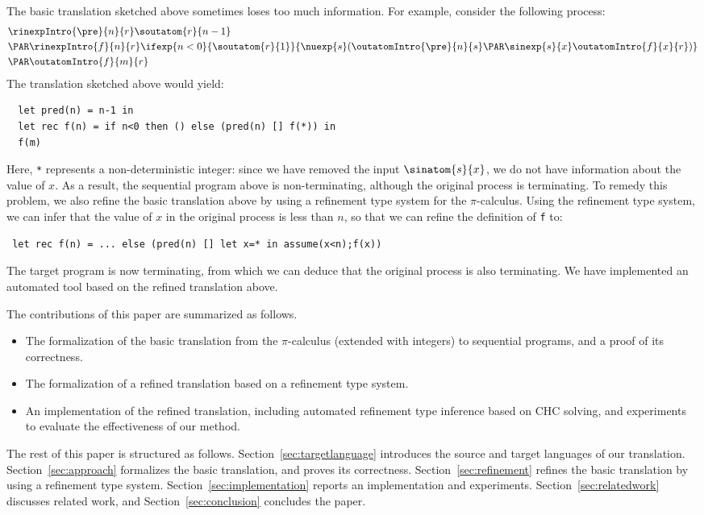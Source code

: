 The basic translation sketched above sometimes loses too much information.
For example, consider the following process:
\begin{align*}
    & \rinexpIntro{\pre}{n}{r} \soutatom{r}{n-1} \\
    & \PAR \rinexpIntro{f}{n}{r} \ifexp{n<0}{ \soutatom{r}{1} }
                                       { \nuexp{s} (\outatomIntro{\pre}{n}{s} \PAR \sinexp{s}{x}\outatomIntro{f}{x}{r}) } \\
    & \PAR \outatomIntro{f}{m}{r}
\end{align*}
The translation sketched above would yield:
\begin{verbatim}
  let pred(n) = n-1 in
  let rec f(n) = if n<0 then () else (pred(n) [] f(*)) in
  f(m)
\end{verbatim}
Here, \texttt{*} represents a non-deterministic integer: since we have removed
the input $\sinatom{s}{x}$, we do not have information about the value of \( x \).
As a result, the sequential program above is non-terminating, although the original
process is terminating.
To remedy this problem, we also refine the basic translation above by using a refinement
type system for the \(\pi\)-calculus. Using the refinement type system,
we can infer that the value of \(x\) in the original process is less than \(n\),
so that we can refine the definition of \texttt{f} to:
\begin{verbatim}
 let rec f(n) = ... else (pred(n) [] let x=* in assume(x<n);f(x))
\end{verbatim}
The target program is now terminating, from which
we can deduce that the original process is also terminating.
We have implemented an automated tool based on the refined translation above.

The contributions of this paper are summarized as follows.
\begin{itemize}
\item The formalization of the basic translation from the \(\pi\)-calculus
  (extended with integers) to sequential programs, and a proof of its correctness.
\item The formalization of a refined translation based on a refinement type system.
\item An implementation of the refined translation, including automated refinement type
  inference based on CHC solving, and experiments to evaluate the effectiveness of
  our method.
\end{itemize}

The rest of this paper is structured as follows.
Section~\ref{sec:targetlanguage} introduces the source and target languages
of our translation.
Section~\ref{sec:approach} 
formalizes the basic translation, and proves its correctness.
Section~\ref{sec:refinement} refines the basic translation by using a refinement type system.
Section~\ref{sec:implementation} reports an implementation and experiments.
Section~\ref{sec:relatedwork} discusses related work,
and Section~\ref{sec:conclusion} concludes the paper.

